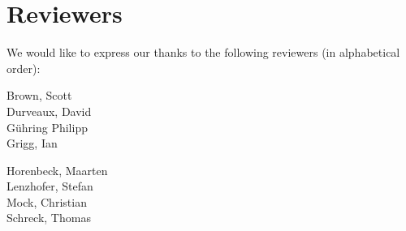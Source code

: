 \section{Reviewers}

We would like to express our thanks to the following reviewers (in alphabetical order):


\vline{}

\begin{minipage}[b]{0.5\linewidth}
\center
Brown, Scott \\
Durveaux, David \\
G\"uhring Philipp  \\
Grigg, Ian  \\
\end{minipage}
\begin{minipage}[b]{0.5\linewidth}
\center
Horenbeck, Maarten \\
Lenzhofer, Stefan \\
Mock, Christian  \\
Schreck, Thomas  \\
\end{minipage}


